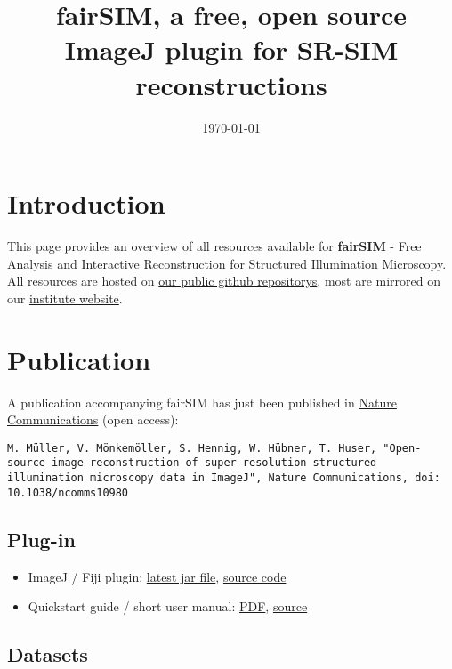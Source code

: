 \documentclass[twoside=false,
           a4paper,
           10pt,DIV=16,parindent=none,parskip=half]{article}
\title{fairSIM, a free, open source ImageJ plugin for SR-SIM reconstructions}
\date{\small \today}
\begin{document}
\maketitle


\section*{Introduction}
This page provides an overview of all resources available
for \textbf{fairSIM}  - Free Analysis and Interactive Reconstruction for Structured Illumination Microscopy.
\\
All resources are hosted on \href{https://github.com/fairSIM}{our public github repositorys},
most are mirrored on our \href{http://www.physik.uni-bielefeld.de/fairsim}{institute website}.

\section*{Publication}

A publication accompanying fairSIM has just been published in
\href{http://www.nature.com/ncomms/2016/160321/ncomms10980/abs/ncomms10980.html}{Nature Communications} (open access):

\texttt{M. Müller, V. Mönkemöller, S. Hennig, W. Hübner, T. Huser, 
"Open-source image reconstruction of super-resolution structured illumination
microscopy data in ImageJ", Nature Communications, doi: 10.1038/ncomms10980}


\subsection*{Plug-in}
\begin{itemize}
\item 
ImageJ / Fiji plugin:
\href{https://github.com/fairSIM/fairSIM/releases/latest}{latest jar file},
\href{https://github.com/fairSIM/fairSIM/}{source code}
\item
Quickstart guide / short user manual:
\href{https://github.com/fairSIM/documentation/releases/latest}{PDF},
\href{https://github.com/fairSIM/documentation}{source}
\end{itemize}


\subsection*{Datasets}
\end{document}
